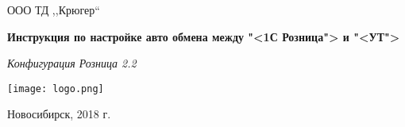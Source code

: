 \begin{titlepage}
  \begin{center}
    \large
  ООО ТД ,,Крюгер``

 
\vspace{2.25cm}

\textbf{Инструкция по настройке авто обмена между "<1С Розница"> и "<УТ">} 

\textit{Конфигурация Розница 2.2}
\vfill    
  
{\texttt{[image: logo.png]}}  
  
\end{center}
\vfill

\newlength{\ML}


\begin{center}
  Новосибирск, 2018 г.
\end{center}
\end{titlepage}